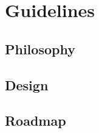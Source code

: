 \section{Guidelines}

\subsection{Philosophy} %





\subsection{Design} %


\subsection{Roadmap} %


